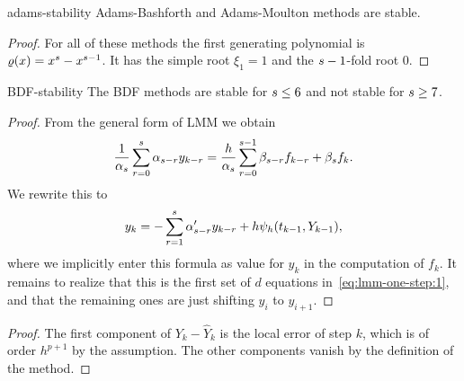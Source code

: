 \begin{Corollary}{adams-stability}
  Adams-Bashforth and Adams-Moulton methods are stable.
\end{Corollary}

\begin{proof}
  For all of these methods the first generating polynomial is $\varrho(x)
  = x^s-x^{s-1}$. It has the simple root $\xi_1 = 1$ and the
  $s-1$-fold root 0.
\end{proof}

\begin{Theorem}{BDF-stability}
  The BDF methods are stable for $s \le 6$ and not
  stable for $s \ge 7$.
\end{Theorem}




\begin{proof}
  From the general form of LMM we
  obtain
  \begin{gather*}
    \frac1{\alpha_s} \sum_{r=0}^s \alpha_{s-r} y_{k-r}
    = \frac{h}{\alpha_s} \sum_{r=0}^{s-1} \beta_{s-r} f_{k-r}
    + \beta_s f_k.
  \end{gather*}
  We rewrite this to
  \begin{gather*}
    y_k = -\sum_{r=1}^{s} \alpha'_{s-r} y_{k-r} +
    h\psi_h(t_{k-1}, Y_{k-1}),
  \end{gather*}
  where we implicitly enter this formula as value for $y_k$ in the
  computation of $f_k$. It remains to realize that this is the first
  set of $d$ equations in~\eqref{eq:lmm-one-step:1}, and that the
  remaining ones are just shifting $y_i$ to $y_{i+1}$.
\end{proof}



\begin{proof}
  The first component of $Y_k - \widehat Y_k$ is the local error of
  step $k$, which is of order $h^{p+1}$ by the assumption. The other
  components vanish by the definition of the method.
\end{proof}



